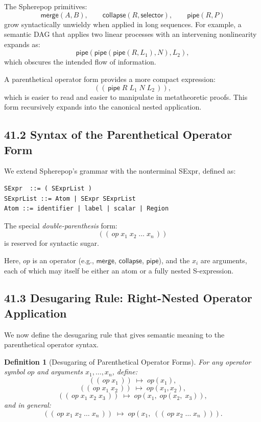 \documentclass[12pt,letterpaper]{article}
\newtheorem{definition}[theorem]{Definition}
\theoremstyle{remark}
\begin{document}
The Spherepop primitives:
\[
\mathsf{merge}(A,B), \qquad
\mathsf{collapse}(R, \mathsf{selector}), \qquad
\mathsf{pipe}(R, P)
\]
grow syntactically unwieldy when applied in long sequences. For example, a semantic DAG that applies two linear processes with an intervening nonlinearity expands as:
\[
\mathsf{pipe}( \mathsf{pipe}( \mathsf{pipe}(R, L_1), N), L_2),
\]
which obscures the intended flow of information.

A parenthetical operator form provides a more compact expression:
\[
((\,\mathsf{pipe}\; R\; L_1\; N\; L_2\,)),
\]
which is easier to read and easier to manipulate in metatheoretic proofs. This form recursively expands into the canonical nested application.

\subsection{41.2 Syntax of the Parenthetical Operator Form}

We extend Spherepop's grammar with the nonterminal \textsf{SExpr}, defined as:

\begin{verbatim}
SExpr  ::= ( SExprList )
SExprList ::= Atom | SExpr SExprList
Atom ::= identifier | label | scalar | Region
\end{verbatim}

The special \emph{double-parenthesis} form:
\[
((\,op\; x_1\; x_2\; \ldots\; x_n\,))
\]
is reserved for syntactic sugar.

Here, $op$ is an operator (e.g., $\mathsf{merge}$, $\mathsf{collapse}$, $\mathsf{pipe}$), and the $x_i$ are arguments, each of which may itself be either an atom or a fully nested S-expression.

\subsection{41.3 Desugaring Rule: Right-Nested Operator Application}

We now define the desugaring rule that gives semantic meaning to the parenthetical operator syntax.

\begin{definition}[Desugaring of Parenthetical Operator Forms]
For any operator symbol $op$ and arguments $x_1,\ldots,x_n$, define:
\[
((\,op\; x_1\,)) \;\mapsto\; op(x_1),
\]
\[
((\,op\; x_1\; x_2\,)) \;\mapsto\; op(x_1, x_2),
\]
\[
((\,op\; x_1\; x_2\; x_3\,)) \;\mapsto\; op(x_1,\; op(x_2,\; x_3)),
\]
and in general:
\[
((\,op\; x_1\; x_2\; \ldots\; x_n\,)) 
\;\mapsto\;
op(x_1,\; ((\,op\; x_2\; \ldots\; x_n\,))).
\]
\end{definition}
\end{document}

